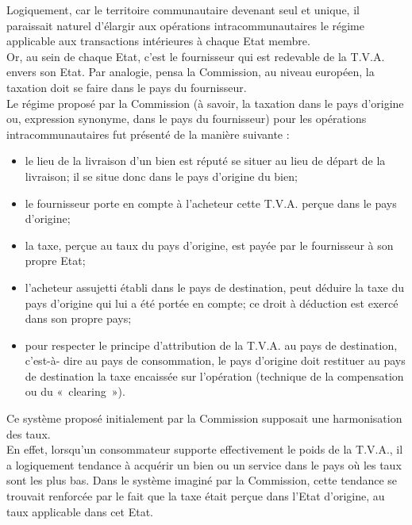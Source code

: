 \documentclass{book}
\begin{document}
Logiquement, car le territoire communautaire devenant seul et unique, il paraissait naturel
d'élargir aux opérations intracommunautaires le régime applicable aux transactions intérieures
à chaque Etat membre.\\

Or, au sein de chaque Etat, c'est le fournisseur qui est redevable de la T.V.A. envers son Etat.
Par analogie, pensa la Commission, au niveau européen, la taxation doit se faire dans le pays
du fournisseur.\\

Le régime proposé par la Commission (à savoir, la taxation dans le pays d'origine ou,
expression synonyme, dans le pays du fournisseur) pour les opérations intracommunautaires
fut présenté de la manière suivante :\\

\begin{itemize}
\item le lieu de la livraison d'un bien est réputé se situer au lieu de départ de la livraison;
il se situe donc dans le pays d'origine du bien;
\item le fournisseur porte en compte à l'acheteur cette T.V.A. perçue dans le pays
d'origine;
\item la taxe, perçue au taux du pays d’origine, est payée par le fournisseur à son propre
Etat;
\item l'acheteur assujetti établi dans le pays de destination, peut déduire la taxe du pays
d'origine qui lui a été portée en compte; ce droit à déduction est exercé dans son
propre pays;
\item pour respecter le principe d'attribution de la T.V.A. au pays de destination, c’est-à-
dire au pays de consommation, le pays d'origine doit restituer au pays de
destination la taxe encaissée sur l'opération (technique de la compensation ou du
«~clearing~»).

\end{itemize}

Ce système proposé initialement par la Commission supposait une harmonisation des taux.\\

En effet, lorsqu'un consommateur supporte effectivement le poids de la T.V.A., il a
logiquement tendance à acquérir un bien ou un service dans le pays où les taux sont les plus
bas. Dans le système imaginé par la Commission, cette tendance se trouvait renforcée par le
fait que la taxe était perçue dans l'Etat d'origine, au taux applicable dans cet Etat.\\
\end{document}
